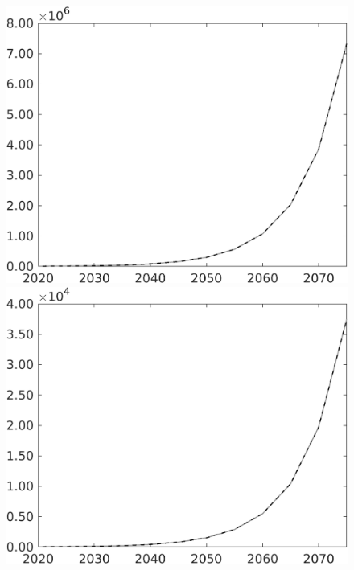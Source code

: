 \documentclass[12pt]{article}
\begin{document}
\begin{figure}[h!!]
\begin{minipage}[]{0.32\textwidth}
\end{minipage}	
	\begin{minipage}[]{0.32\textwidth}
		\includegraphics[width=1\textwidth]{../../codding_model/own_basedOnFried/optimalPol_010922_revision/figures/all_13Sept22/CompTaul_Equlab_LFBAU_Reg0_Af_spillover0_nsk1_xgr1_knspil1_sep1_countec0_GovRev0_etaa0.79_lgd0.png}
	\end{minipage}	
	\begin{minipage}[]{0.32\textwidth}
		\includegraphics[width=1\textwidth]{../../codding_model/own_basedOnFried/optimalPol_010922_revision/figures/all_13Sept22/CompTaul_Equlab_LFBAU_Reg0_Ag_spillover0_nsk1_xgr1_knspil1_sep1_countec0_GovRev0_etaa0.79_lgd0.png}

\end{minipage}
\end{figure}
\end{document}
